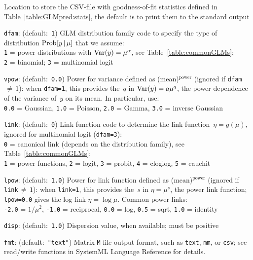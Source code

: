 \begin{Description}
Location to store the CSV-file with goodness-of-fit statistics defined in
Table~\ref{table:GLMpred:stats}, the default is to print them to the standard output
\item[{\tt dfam}:] (default:\mbox{ }{\tt 1})
GLM distribution family code to specify the type of distribution $\mathop{\mathrm{Prob}\hspace{0.5pt}}\nolimits[y\,|\,\mu]$
that we assume: \\
{\tt 1} = power distributions with $\mathop{\mathrm{Var}}\nolimits(y) = \mu^{\alpha}$, see Table~\ref{table:commonGLMs};\\
{\tt 2} = binomial; 
{\tt 3} = multinomial logit
\item[{\tt vpow}:] (default:\mbox{ }{\tt 0.0})
Power for variance defined as (mean)${}^{\textrm{power}}$ (ignored if {\tt dfam}$\,{\neq}\,1$):
when {\tt dfam=1}, this provides the~$q$ in $\mathop{\mathrm{Var}}\nolimits(y) = a\mu^q$, the power
dependence of the variance of~$y$ on its mean.  In particular, use:\\
{\tt 0.0} = Gaussian,
{\tt 1.0} = Poisson,
{\tt 2.0} = Gamma,
{\tt 3.0} = inverse Gaussian
\item[{\tt link}:] (default:\mbox{ }{\tt 0})
Link function code to determine the link function~$\eta = g(\mu)$, ignored for
multinomial logit ({\tt dfam=3}):\\
{\tt 0} = canonical link (depends on the distribution family), see Table~\ref{table:commonGLMs};\\
{\tt 1} = power functions,
{\tt 2} = logit,
{\tt 3} = probit,
{\tt 4} = cloglog,
{\tt 5} = cauchit
\item[{\tt lpow}:] (default:\mbox{ }{\tt 1.0})
Power for link function defined as (mean)${}^{\textrm{power}}$ (ignored if {\tt link}$\,{\neq}\,1$):
when {\tt link=1}, this provides the~$s$ in $\eta = \mu^s$, the power link
function; {\tt lpow=0.0} gives the log link $\eta = \log\mu$.  Common power links:\\
{\tt -2.0} = $1/\mu^2$,
{\tt -1.0} = reciprocal,
{\tt 0.0} = log,
{\tt 0.5} = sqrt,
{\tt 1.0} = identity
\item[{\tt disp}:] (default:\mbox{ }{\tt 1.0})
Dispersion value, when available; must be positive
\item[{\tt fmt}:] (default:\mbox{ }{\tt "text"})
Matrix {\tt M} file output format, such as {\tt text}, {\tt mm}, or {\tt csv};
see read/write functions in SystemML Language Reference for details.
\end{Description}


